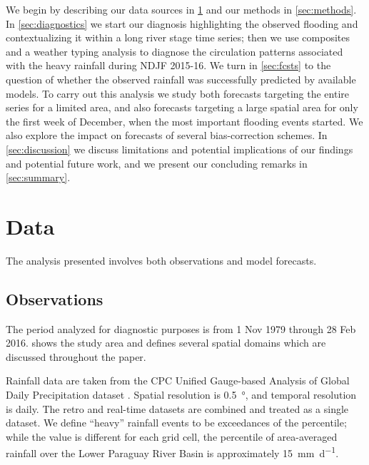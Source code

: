 \documentclass{ametsoc}
\begin{document}
We begin by describing our data sources in \cref{sec:data} and our methods in \cref{sec:methods}.
In \cref{sec:diagnostics} we start our diagnosis highlighting the observed flooding and contextualizing it within a long river stage time series; then we use composites and a weather typing analysis to diagnose the circulation patterns associated with the heavy rainfall during NDJF 2015-16. We turn in \cref{sec:fcsts} to the question of whether the observed rainfall was successfully predicted by available models.
To carry out this analysis we study both forecasts targeting the entire series for a limited area, and also forecasts targeting a large spatial area for only the first week of December, when the most important flooding events started.
We also explore the impact on forecasts of several bias-correction schemes.
In \cref{sec:discussion} we discuss limitations and potential implications of our findings and potential future work, and we present our concluding remarks in \cref{sec:summary}.


\section{Data} \label{sec:data}

The analysis presented involves both observations and model forecasts.

\subsection{Observations}

The period analyzed for diagnostic purposes is from 1 Nov 1979 through 28 Feb 2016.
 shows the study area and defines several spatial domains which are discussed throughout the paper.

Rainfall data are taken from the CPC Unified Gauge-based Analysis of Global Daily Precipitation dataset \citep{xie2010cpc}.
Spatial resolution is \SI{0.5}{\degree}, and temporal resolution is daily.
The retro and real-time datasets are combined and treated as a single dataset.
We define ``heavy'' rainfall events to be exceedances of the  percentile; while the value is different for each grid cell, the  percentile of area-averaged rainfall over the Lower Paraguay River Basin is approximately \SI{15}{\milli\meter\per\day}.
\end{document}
